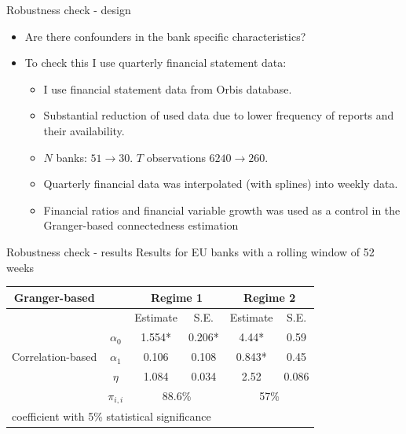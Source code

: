 \documentclass{beamer}
\begin{document}
\begin{frame}{Robustness check - design}
  
    \begin{itemize}
      \item<1-> Are there confounders in the bank specific characteristics?
      \item<2-> To check this I use quarterly financial statement data:
      \begin{itemize}
        \item<3-> I use financial statement data from Orbis database.
        \item<4-> Substantial reduction of used data due to lower frequency of reports and their availability.
        \item<5-> $N$ banks: $51 \rightarrow 30$. $T$ observations $6240 \rightarrow 260$.
        \item<6-> Quarterly financial data was interpolated (with splines) into weekly data.
        \item<7-> Financial ratios and financial variable growth was used as a control in the Granger-based connectedness estimation
      \end{itemize}
\end{itemize}
\end{frame}

\begin{frame}{Robustness check - results}
  Results for EU banks with a rolling window of 52 weeks
  \begin{table}\small
    \begin{tabular}{cccccc}
      \toprule
       Granger-based &  & \multicolumn{2}{c}{\bfseries Regime 1} & \multicolumn{2}{c}{\bfseries Regime 2}  \\
       \hline
       & & Estimate & S.E. & Estimate & S.E. \\
       \hline
       \multirow{3}{*}[\normalbaselineskip]{Correlation-based} & $\alpha_0$ & 1.554* & 0.206* & 4.44*  & 0.59 \\
        & $\alpha_1$ & 0.106 & 0.108 & 0.843* & 0.45 \\
        & $\eta$ & 1.084 & 0.034 & 2.52 & 0.086 \\
        & $\pi_{i,i}$ &  \multicolumn{2}{c}{88.6\%} & \multicolumn{2}{c}{57\%}\\
        \hline
      \multicolumn{6}{l}{\footnotesize * coefficient with 5\% statistical significance} \\
      \hline
    \end{tabular}
  \end{table}
\end{frame}  
\end{document}
